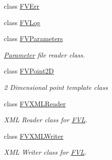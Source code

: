 \begin{DoxyCompactItemize}
class \hyperlink{classFVL_1_1FVErr}{FVErr}
\item 
class \hyperlink{classFVL_1_1FVLog}{FVLog}
\item 
class \hyperlink{classFVL_1_1FVParameters}{FVParameters}
\begin{DoxyCompactList}\small\item\em \hyperlink{classParameter}{Parameter} file reader class. \item\end{DoxyCompactList}\item 
class \hyperlink{classFVL_1_1FVPoint2D}{FVPoint2D}
\begin{DoxyCompactList}\small\item\em 2 Dimensional point template class \item\end{DoxyCompactList}\item 
class \hyperlink{classFVL_1_1FVXMLReader}{FVXMLReader}
\begin{DoxyCompactList}\small\item\em XML Reader class for \hyperlink{namespaceFVL}{FVL}. \item\end{DoxyCompactList}\item 
class \hyperlink{classFVL_1_1FVXMLWriter}{FVXMLWriter}
\begin{DoxyCompactList}\small\item\em XML Writer class for \hyperlink{namespaceFVL}{FVL}. \item\end{DoxyCompactList}\end{DoxyCompactItemize}
